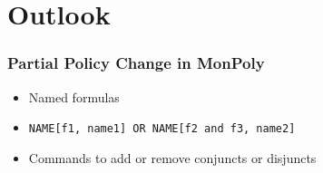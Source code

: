 \section{Outlook}

\begin{frame}
    \frametitle{Partial Policy Change in MonPoly}
    \begin{itemize}
        \item Named formulas
        \item  \texttt{NAME[f1, name1] OR NAME[f2 and f3, name2]}
        \item Commands to add or remove conjuncts or disjuncts
    \end{itemize}

    
\end{frame}